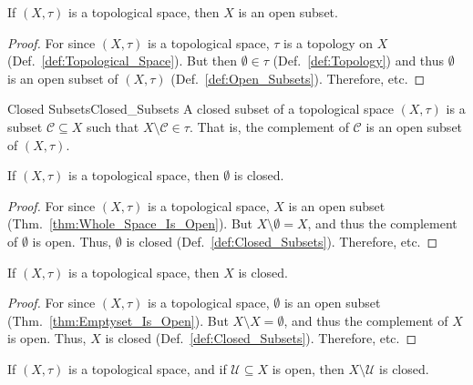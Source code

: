         \begin{theorem}
            \label{thm:Whole_Space_Is_Open}%
            If $(X,\tau)$ is a topological space, then
            $X$ is an open subset.
        \end{theorem}
        \begin{proof}
            For since $(X,\tau)$ is a topological space,
            $\tau$ is a topology on $X$
            (Def.~\ref{def:Topological_Space}). But then
            $\emptyset\in\tau$ (Def.~\ref{def:Topology}) and
            thus $\emptyset$ is an open subset of $(X,\tau)$
            (Def.~\ref{def:Open_Subsets}). Therefore, etc.
        \end{proof}
        \begin{ldefinition}{Closed Subsets}{Closed_Subsets}
            A closed subset of a topological space $(X,\tau)$
            is a subset $\mathcal{C}\subseteq{X}$ such that
            $X\setminus\mathcal{C}\in\tau$. That is, the complement
            of $\mathcal{C}$ is an open subset of $(X,\tau)$.
        \end{ldefinition}
        \begin{theorem}
            \label{thm:Emptyset_Is_Closed}%
            If $(X,\tau)$ is a topological space, then
            $\emptyset$ is closed.
        \end{theorem}
        \begin{proof}
            For since $(X,\tau)$ is a topological space, $X$ is an
            open subset (Thm.~\ref{thm:Whole_Space_Is_Open}).
            But $X\setminus\emptyset=X$, and thus the complement
            of $\emptyset$ is open. Thus, $\emptyset$ is
            closed (Def.~\ref{def:Closed_Subsets}).
            Therefore, etc.
        \end{proof}
        \begin{theorem}
            \label{thm:Whole_Space_Is_Closed}%
            If $(X,\tau)$ is a topological space, then $X$ is closed.
        \end{theorem}
        \begin{proof}
            For since $(X,\tau)$ is a topological space, $\emptyset$
            is an open subset (Thm.~\ref{thm:Emptyset_Is_Open}).
            But $X\setminus{X}=\emptyset$, and thus the complement
            of $X$ is open. Thus, $X$ is closed
            (Def.~\ref{def:Closed_Subsets}). Therefore, etc.
        \end{proof}
        \begin{theorem}
            \label{thm:Comp_of_Open_is_Closed}%
            If $(X,\tau)$ is a topological space, and if
            $\mathcal{U}\subseteq{X}$ is open, then
            $X\setminus\mathcal{U}$ is closed.
        \end{theorem}
